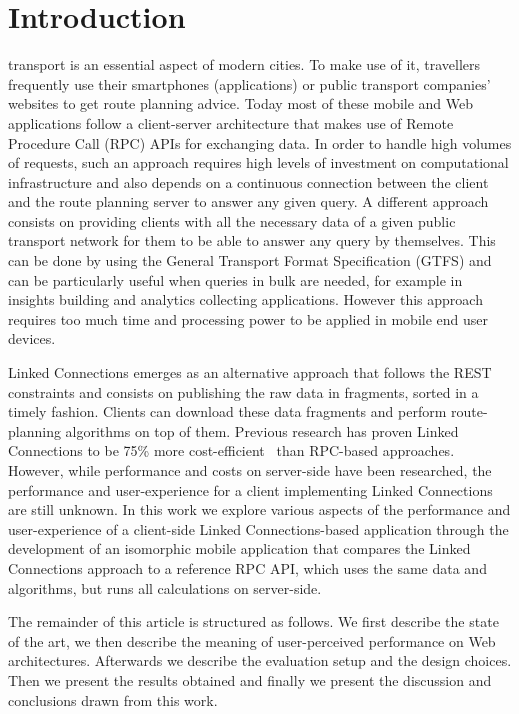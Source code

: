 \documentclass[twocolumn]{phdsymp} %
\begin{document}
\section{Introduction}
 transport is an essential aspect of modern cities. To make use of it, travellers frequently use their smartphones (applications) or public transport companies' websites to get route planning advice. Today most of these mobile and Web applications follow a client-server architecture that makes use of Remote Procedure Call (RPC) APIs for exchanging data. In order to handle high volumes of requests, such an approach requires high levels of investment on computational infrastructure and also depends on a continuous connection between the client and the route planning server to answer any given query. A different approach consists on providing clients with all the necessary data of a given public transport network for them to be able to answer any query by themselves. This can be done by using the General Transport Format Specification (GTFS) and can be particularly useful when queries in bulk are needed, for example in insights building and analytics collecting applications. However this approach requires too much time and processing power to be applied in mobile end user devices.

Linked Connections emerges as an alternative approach that follows the REST constraints and consists on publishing the raw data in fragments, sorted in a timely fashion. Clients can download these data fragments and perform route-planning algorithms on top of them. Previous research has proven Linked Connections to be 75\% more cost-efficient~\cite{colpaert17} than \textsc{RPC}-based approaches. However, while performance and costs on server-side have been researched, the performance and user-experience for a client implementing Linked Connections are still unknown. In this work we explore various aspects of the performance and user-experience of a client-side Linked Connections-based application through the development of an isomorphic mobile application that compares the Linked Connections approach to a reference \textsc{RPC} API, which uses the same data and algorithms, but runs all calculations on server-side.

The remainder of this article is structured as follows. We first describe the state of the art, we then describe the meaning of user-perceived performance on Web architectures. Afterwards we describe the evaluation setup and the design choices. Then we present the results obtained and finally we present the discussion and conclusions drawn from this work.
\end{document}
